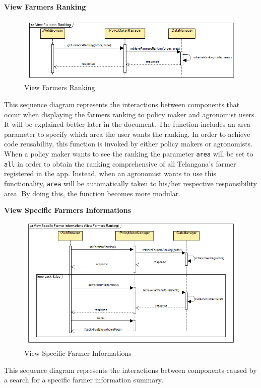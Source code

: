 \documentclass[table, 12pt]{article}
\begin{document}
\newpage
\textbf{View Farmers Ranking}
\begin{center}
    \begin{figure}[H]
        \includegraphics[scale=0.8, center]{assets/SequenceDiagram/ViewFarmersRanking.png}
        \caption{View Farmers Ranking}
        \label{fig: ranking}
    \end{figure}
\end{center}
This sequence diagram represents the interactions between components that occur when displaying the farmers ranking to policy maker and agronomist users.
It will be explained better later in the document. %
The function includes an area parameter to specify which area the user wants the ranking.
In order to achieve code reusability, this function is invoked by either policy makers or agronomists. 
When a policy maker wants to see the ranking the parameter \texttt{area} will be set to \texttt{all} in order to obtain the ranking comprehensive of all Telangana's farmer registered in the app.
Instead, when an agronomist wants to use this functionality, \texttt{area} will be automatically taken to his/her respective responsibility area. By doing this, the function becomes more modular.

\newpage
\textbf{View Specific Farmers Informations}
\begin{center}
    \begin{figure}[H]
        \includegraphics[scale=0.8, center]{assets/SequenceDiagram/ViewSpecificFarmerInformations.png}
        \caption{View Specific Farmer Informations}
        \label{fig: specificFarmerInfo}
    \end{figure}
\end{center}
This sequence diagram represents the interactions between components caused by a search for a specific farmer information summary.
\end{document}
